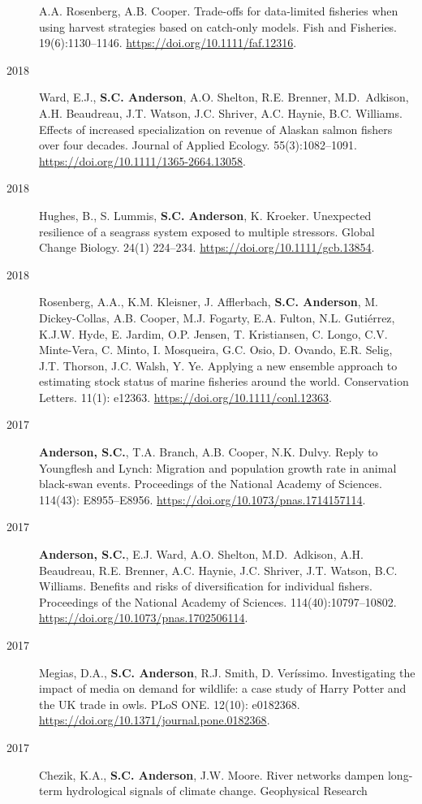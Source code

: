 \begin{description}
A.A. Rosenberg, A.B. Cooper. Trade-offs for data-limited fisheries when
using harvest strategies based on catch-only models. Fish and Fisheries.
19(6):1130--1146. \url{https://doi.org/10.1111/faf.12316}.
\item[2018]
Ward, E.J., \textbf{S.C. Anderson}, A.O. Shelton, R.E. Brenner,
M.D.\ Adkison, A.H. Beaudreau, J.T. Watson, J.C. Shriver, A.C. Haynie,
B.C. Williams. Effects of increased specialization on revenue of Alaskan
salmon fishers over four decades. Journal of Applied Ecology.
55(3):1082--1091. \url{https://doi.org/10.1111/1365-2664.13058}.
\item[2018]
Hughes, B., S. Lummis, \textbf{S.C. Anderson}, K. Kroeker. Unexpected
resilience of a seagrass system exposed to multiple stressors. Global
Change Biology. 24(1) 224--234. \url{https://doi.org/10.1111/gcb.13854}.
\item[2018]
Rosenberg, A.A., K.M. Kleisner, J. Afflerbach, \textbf{S.C. Anderson},
M. Dickey-Collas, A.B. Cooper, M.J. Fogarty, E.A. Fulton, N.L.
Gutiérrez, K.J.W. Hyde, E. Jardim, O.P. Jensen, T. Kristiansen, C.
Longo, C.V. Minte-Vera, C. Minto, I. Mosqueira, G.C. Osio, D. Ovando,
E.R. Selig, J.T. Thorson, J.C. Walsh, Y. Ye. Applying a new ensemble
approach to estimating stock status of marine fisheries around the
world. Conservation Letters. 11(1): e12363.
\url{https://doi.org/10.1111/conl.12363}.
\item[2017]
\textbf{Anderson, S.C.}, T.A. Branch, A.B. Cooper, N.K. Dulvy. Reply to
Youngflesh and Lynch: Migration and population growth rate in animal
black-swan events. Proceedings of the National Academy of Sciences.
114(43): E8955--E8956. \url{https://doi.org/10.1073/pnas.1714157114}.
\item[2017]
\textbf{Anderson, S.C.}, E.J. Ward, A.O. Shelton, M.D.\ Adkison, A.H.
Beaudreau, R.E. Brenner, A.C. Haynie, J.C. Shriver, J.T. Watson, B.C.
Williams. Benefits and risks of diversification for individual fishers.
Proceedings of the National Academy of Sciences. 114(40):10797--10802.
\url{https://doi.org/10.1073/pnas.1702506114}.
\item[2017]
Megias, D.A., \textbf{S.C. Anderson}, R.J. Smith, D. Veríssimo.
Investigating the impact of media on demand for wildlife: a case study
of Harry Potter and the UK trade in owls. PLoS ONE. 12(10): e0182368.
\url{https://doi.org/10.1371/journal.pone.0182368}.
\item[2017]
Chezik, K.A., \textbf{S.C. Anderson}, J.W. Moore. River networks dampen
long-term hydrological signals of climate change. Geophysical Research

\end{description}
